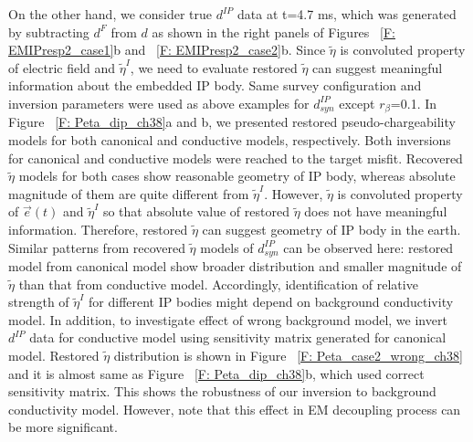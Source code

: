 \documentclass[a4paper, 11pt]{article}
\newcommand {\e}  { {\vec e} }
\newcommand{\peta}{\tilde{\eta}}
\newcommand{\dip}{d^{IP}}
\begin{document}
On the other hand, we consider true $d^{IP}$ data at t=4.7 ms, which was generated by subtracting $d^{F}$ from $d$ as shown in the right panels of Figures ~\ref{F: EMIPresp2_case1}b and ~\ref{F: EMIPresp2_case2}b. Since $\peta$ is convoluted property of electric field and $\peta^{I}$, we need to evaluate restored $\peta$ can suggest meaningful information about the embedded IP body. Same survey configuration and inversion parameters were used as above examples for $d^{IP}_{syn}$ except $r_{\beta}$=0.1. In Figure ~\ref{F: Peta_dip_ch38}a and b, we presented restored pseudo-chargeability models for both canonical and conductive models, respectively. Both inversions for canonical and conductive models were reached to the target misfit. Recovered $\peta$ models for both cases show reasonable geometry of IP body, whereas absolute magnitude of them are quite different from $\peta^{I}$. However, $\peta$ is convoluted property of $\e(t)$ and $\peta^{I}$ so that absolute value of restored $\peta$ does not have meaningful information. Therefore, restored $\peta$ can suggest geometry of IP body in the earth. Similar patterns from recovered $\peta$ models of $\dip_{syn}$ can be observed here: restored model from canonical model show broader distribution and smaller magnitude of $\peta$ than that from conductive model. Accordingly, identification of relative strength of $\peta^I$ for different IP bodies might depend on background conductivity model. In addition, to investigate effect of wrong background model, we invert $d^{IP}$ data for conductive model using sensitivity matrix generated for canonical model. Restored $\peta$ distribution is shown in Figure ~\ref{F: Peta_case2_wrong_ch38} and it is almost same as Figure ~\ref{F: Peta_dip_ch38}b, which used correct sensitivity matrix. This shows the robustness of our inversion to background conductivity model. However, note that this effect in EM decoupling process can be more significant.
\end{document}
